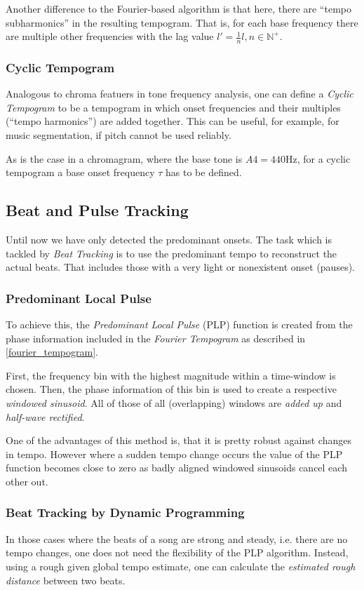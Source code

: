 \documentclass[a4paper, 9pt, twocolumn]{extarticle}
\begin{document}
Another difference to the Fourier-based algorithm is that here, there are ``tempo subharmonics''
in the resulting tempogram. That is, for each base frequency there are multiple other
frequencies with the lag value $l' = \frac{1}{n}l, n\in\mathbb{N}^+$.

\subsubsection{Cyclic Tempogram}
Analogous to chroma featuers in tone frequency analysis, one can define a \emph{Cyclic Tempogram}
to be a tempogram in which onset frequencies and their multiples (``tempo harmonics'') are
added together. This can be useful, for example, for music segmentation, if pitch cannot be
used reliably.

As is the case in a chromagram, where the base tone is $ A4=440\text{Hz} $, for a cyclic
tempogram a base onset frequency $\tau$ has to be defined.

\subsection{Beat and Pulse Tracking}
Until now we have only detected the predominant onsets. The task which is tackled by \emph{Beat
Tracking} is to use the predominant tempo to reconstruct the actual beats. That includes those with
a very light or nonexistent onset (pauses).

\subsubsection{Predominant Local Pulse}
To achieve this, the \emph{Predominant Local Pulse} (PLP) function is created from the phase
information included in the \emph{Fourier Tempogram} as described in \ref{fourier_tempogram}.

First, the frequency bin with the highest magnitude within a time-window is chosen.
Then, the phase information of this bin is used to create a respective \emph{windowed sinusoid}.
All of those of all (overlapping) windows are \emph{added up} and \emph{half-wave rectified}.

One of the advantages of this method is, that it is pretty robust against changes in tempo.
However where a sudden tempo change occurs the value of the PLP function becomes close to zero
as badly aligned windowed sinusoids cancel each other out.

\subsubsection{Beat Tracking by Dynamic Programming}
In those cases where the beats of a song are strong and steady, i.e. there are no tempo changes,
one does not need the flexibility of the PLP algorithm. Instead, using a rough given global tempo
estimate, one can calculate the \emph{estimated rough distance} between two beats.
\end{document}
